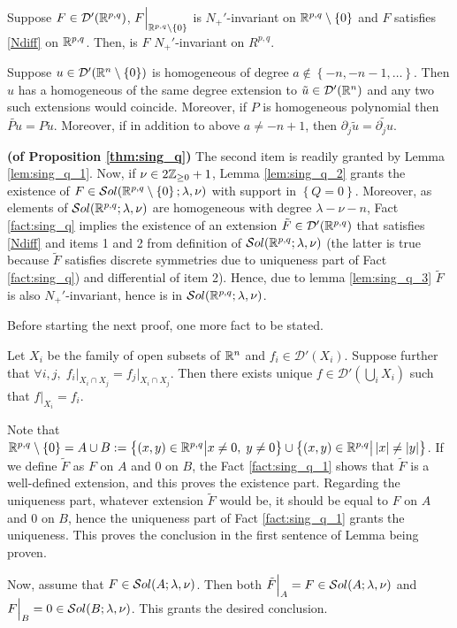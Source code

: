 \documentclass[10pt]{article} %
\newcommand{\D}{\mathcal{D}}
\theoremstyle{definition}
\theoremstyle{remark}
\begin{document}
\begin{mylem}
	Suppose $F\in\D'(\R^{p,q})$, $F\Big|_{\R^{p,q}\setminus\left\{ 0 \right\}}$ is $N_+'$-invariant on $\R^{p,q}
	\setminus\left\{ 0 \right\}$ and $F$ satisfies \eqref{Ndiff} on $\R^{p,q}$. Then, is $F$ $N_{+}'$-invariant
	on $R^{p,q}$.
	\label{lem:sing_q_4}
\end{mylem}
\begin{myfact}{\bf\cite[thm 3.2.3]{hormander1983analysis}}\newline
	Suppose $u\in\D'(\R^n\setminus\left\{ 0 \right\})$ is homogeneous of degree $a\notin\left\{ -n,-n-1,\dots \right\}$.
	Then $u$ has a homogeneous of the same degree extension to $\tilde{u}\in\D'(\R^n)$ and any two such extensions would coincide.
	Moreover, if $P$ is homogeneous polynomial then $\tilde{Pu}=P\tilde{u}$. Moreover, if in addition to above $a\neq -n+1$,
	then $\partial_j\tilde{u}=\tilde{\partial_ju}$.
	\label{fact:sing_q}
\end{myfact}
\begin{myproof}{\bf (of Proposition \ref{thm:sing_q})}\newline
	The second item is readily granted by Lemma \ref{lem:sing_q_1}. Now, if $\nu\in2\Z_{\geq0}+1$, Lemma \ref{lem:sing_q_2}
	grants the existence of $F\in\sol[\R^{p,q}\setminus\left\{ 0 \right\}]$ with support in $\left\{ Q=0 \right\}$.
	Moreover, as elements of $\sol$ are homogeneous with degree $\lambda-\nu-n$, Fact 
	\ref{fact:sing_q}
	implies the existence of an extension $\tilde{F}\in\D'(\R^{p,q})$ that satisfies \eqref{Ndiff} and items 1 and 2
	from definition of $\sol$ (the latter is true because $\tilde{F}$ satisfies
	discrete symmetries due to uniqueness part of Fact \ref{fact:sing_q}) and differential of item 2).
	Hence, due to lemma \ref{lem:sing_q_3} $\tilde{F}$ is also $N_+'$-invariant, hence is in $\sol$.
\end{myproof}
Before starting the next proof, one more fact to be stated.
\begin{myfact}
	Let $X_i$ be the family of open subsets of $\R^n$ and $f_i\in\D'(X_i)$. Suppose further
	that $\forall i,j,\;f_i\Big|_{X_i\cap X_j}=f_j\Big|_{X_i\cap X_j}$. Then there exists unique
	$f\in\D'(\bigcup_iX_i)$ such that $f\Big|_{X_i}=f_i$.
	\label{fact:sing_q_1}
\end{myfact}
\begin{myproof}
	Note that $\R^{p,q}\setminus\left\{ 0 \right\}=A\cup B:
	=\mysetn{(x,y)\in\R^{p,q}}{x\neq0,\;y\neq0}\cup\mysetn{(x,y)\in\R^{p,q}}
	{\myabs{x}\neq\myabs{y}}$. If we define $\tilde{F}$ as $F$ on $A$ and 0 on $B$, the Fact \ref{fact:sing_q_1}
	shows that $\tilde{F}$ is a well-defined extension, and this proves the existence part. Regarding the uniqueness part,
	whatever extension $\tilde{F}$ would be, it should be equal to $F$ on $A$ and 0 on $B$, hence the uniqueness part 
	of Fact \ref{fact:sing_q_1} grants the uniqueness. This proves the conclusion in the first sentence of Lemma being proven.

	Now, assume that $F\in\sol[A]$. Then both $\tilde{F}\Big|_A=F\in\sol[A]$ and
	$F\Big|_B=0\in\sol[B]$. This grants the desired conclusion.
\end{myproof}
\end{document}
